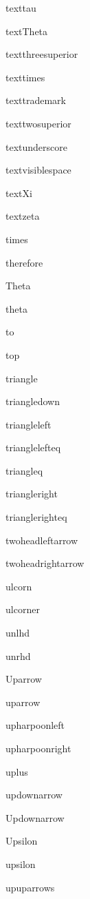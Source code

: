 \documentclass{article}
\begin{document}
texttau    \texttau{}

textTheta    \textTheta{}

textthreesuperior    \textthreesuperior{}

texttimes    \texttimes{}

texttrademark    \texttrademark{}

texttwosuperior    \texttwosuperior{}

textunderscore    \textunderscore{}

textvisiblespace    \textvisiblespace{}

textXi    \textXi{}

textzeta    \textzeta{}

times    \times{}

therefore    \therefore{}

Theta    \Theta{}

theta    \theta{}

to    \to{}

top    \top{}

triangle    \triangle{}

triangledown    \triangledown{}

triangleleft    \triangleleft{}

trianglelefteq    \trianglelefteq{}

triangleq    \triangleq{}

triangleright    \triangleright{}

trianglerighteq    \trianglerighteq{}

twoheadleftarrow    \twoheadleftarrow{}

twoheadrightarrow    \twoheadrightarrow{}


ulcorn    \ulcorn{}

ulcorner    \ulcorner{}

unlhd    \unlhd{}

unrhd    \unrhd{}

Uparrow    \Uparrow{}

uparrow    \uparrow{}

upharpoonleft    \upharpoonleft{}

upharpoonright    \upharpoonright{}

uplus    \uplus{}

updownarrow    \updownarrow{}

Updownarrow    \Updownarrow{}

Upsilon    \Upsilon{}

upsilon    \upsilon{}

upuparrows    \upuparrows{}
\end{document}
